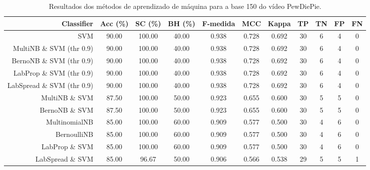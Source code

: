\begin{table}[!htb]
\centering
\caption{Resultados dos métodos de aprendizado de máquina para a base 150 do vídeo PewDiePie.}
\label{tab:PewDiePie-150}
\begin{tabular}{r|c|c|c|c|c|c|c|c|c|c}
\hline\hline
Classifier & Acc (\%) & SC (\%) & BH (\%) & F-medida & MCC & Kappa & TP & TN & FP & FN \\ \hline
SVM & 90.00 & 100.00 & 40.00 & 0.938 & 0.728 & 0.692 & 30 & 6 & 4 & 0 \\ 
MultiNB \& SVM (thr 0.9) & 90.00 & 100.00 & 40.00 & 0.938 & 0.728 & 0.692 & 30 & 6 & 4 & 0 \\ 
BernoNB \& SVM (thr 0.9) & 90.00 & 100.00 & 40.00 & 0.938 & 0.728 & 0.692 & 30 & 6 & 4 & 0 \\ 
LabProp \& SVM (thr 0.9) & 90.00 & 100.00 & 40.00 & 0.938 & 0.728 & 0.692 & 30 & 6 & 4 & 0 \\ 
LabSpread \& SVM (thr 0.9) & 90.00 & 100.00 & 40.00 & 0.938 & 0.728 & 0.692 & 30 & 6 & 4 & 0 \\ 
MultiNB \& SVM & 87.50 & 100.00 & 50.00 & 0.923 & 0.655 & 0.600 & 30 & 5 & 5 & 0 \\ 
BernoNB \& SVM & 87.50 & 100.00 & 50.00 & 0.923 & 0.655 & 0.600 & 30 & 5 & 5 & 0 \\ 
MultinomialNB & 85.00 & 100.00 & 60.00 & 0.909 & 0.577 & 0.500 & 30 & 4 & 6 & 0 \\ 
BernoulliNB & 85.00 & 100.00 & 60.00 & 0.909 & 0.577 & 0.500 & 30 & 4 & 6 & 0 \\ 
LabProp \& SVM & 85.00 & 100.00 & 60.00 & 0.909 & 0.577 & 0.500 & 30 & 4 & 6 & 0 \\ 
LabSpread \& SVM & 85.00 & 96.67 & 50.00 & 0.906 & 0.566 & 0.538 & 29 & 5 & 5 & 1 \\ 
\hline\hline
\end{tabular}
\end{table}
